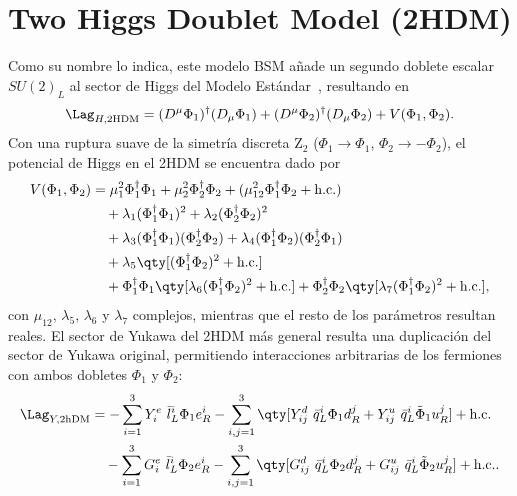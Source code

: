 \chapter{Two Higgs Doublet Model (2HDM)} \label{ap:ap1}

Como su nombre lo indica, este modelo BSM añade un segundo doblete escalar $SU(2)_L$ al sector de Higgs del Modelo Estándar~\cite{Degrande2015a,Jurciukonis2019}, resultando en
\[ \Lag_{H, \text{2HDM}} = (D^\mu \Phi_1)^\dagger (D_\mu \Phi_1) + (D^\mu \Phi_2)^\dagger (D_\mu \Phi_2) + V(\Phi_1, \Phi_2). \]
Con una ruptura suave de la simetría discreta $\mathrm{Z}_2$ ($\Phi_1 \to \Phi_1$, $\Phi_2 \to -\Phi_2$), el potencial de Higgs en el 2HDM se encuentra dado por
\begin{align*}
  V(\Phi_1, \Phi_2) &= \mu_1^2 \Phi_1^\dagger \Phi_1 + \mu_2^2 \Phi_2^\dagger \Phi_2 + (\mu_{12}^2 \Phi_1^\dagger \Phi_2 + \text{h.c.}) \\
    &\quad + \lambda_1 (\Phi_1^\dagger \Phi_1)^2 + \lambda_2 (\Phi_2^\dagger \Phi_2)^2 \\
    &\quad + \lambda_3 (\Phi_1^\dagger \Phi_1) (\Phi_2^\dagger \Phi_2) + \lambda_4 (\Phi_1^\dagger \Phi_2) (\Phi_2^\dagger \Phi_1) \\
    &\quad + \lambda_5 \qty[ (\Phi_1^\dagger \Phi_2)^2 + \text{h.c.}] \\
    &\quad + \Phi_1^\dagger \Phi_1 \qty[ \lambda_6 (\Phi_1^\dagger \Phi_2)^2 + \text{h.c.}] + \Phi_2^\dagger \Phi_2 \qty[ \lambda_7 (\Phi_1^\dagger \Phi_2)^2 + \text{h.c.}],
\end{align*}
con $\mu_{12}$, $\lambda_5$, $\lambda_6$ y $\lambda_7$ complejos, mientras que el resto de los parámetros resultan reales. El sector de Yukawa del 2HDM más general resulta una duplicación del sector de Yukawa original, permitiendo interacciones arbitrarias de los fermiones con ambos dobletes $\Phi_1$ y $\Phi_2$:
\begin{align*}
  \Lag_{Y, \text{2hDM}} &= -\sum_{i = 1}^3 Y^e_{i} \ \bar{l}_L^i \Phi_1 e_R^i -\sum_{i,j =1}^3 \qty[ Y_{ij}^d \ \bar{q}_L^i \Phi_1 d^j_R + Y_{ij}^u \ \bar{q}_L^i \tilde{\Phi}_1 u^j_R ] + \text{h.c.} \\
    &\quad -\sum_{i = 1}^3 G^e_{i} \ \bar{l}_L^i \Phi_2 e_R^i -\sum_{i,j =1}^3 \qty[ G_{ij}^d \ \bar{q}_L^i \Phi_2 d^j_R + G_{ij}^u \ \bar{q}_L^i \tilde{\Phi}_2 u^j_R ] + \text{h.c.}.
\end{align*}

